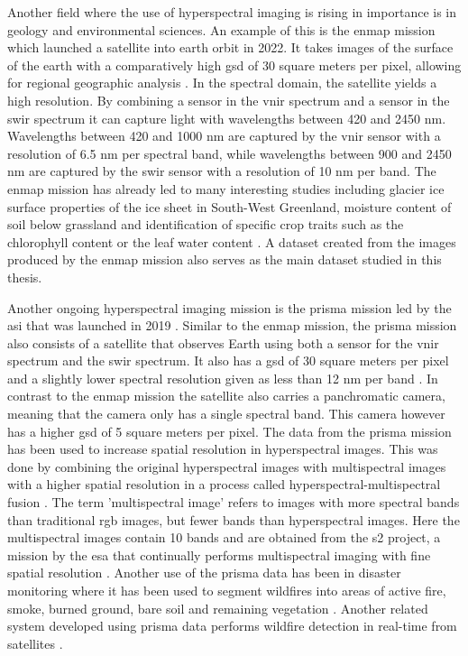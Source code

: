 Another field where the use of hyperspectral imaging is rising in importance is in geology and environmental sciences. An example of this is the \ac{enmap} mission which launched a satellite into earth orbit in 2022. It takes images of the surface of the earth with a comparatively high \ac{gsd} of 30 square meters per pixel, allowing for regional geographic analysis \citep{guanter_enmap_2015}. In the spectral domain, the satellite yields a high resolution. By combining a sensor in the \ac{vnir} spectrum and a sensor in the \ac{swir} spectrum it can capture light with wavelengths between 420 and 2450 nm. Wavelengths between 420 and 1000 nm are captured by the \ac{vnir} sensor with a resolution of 6.5 nm per spectral band, while wavelengths between 900 and 2450 nm are captured by the \ac{swir} sensor with a resolution of 10 nm per band.
The \ac{enmap} mission has already led to many interesting studies including glacier ice surface properties of the ice sheet in South-West Greenland, moisture content of soil below grassland and identification of specific crop traits such as the chlorophyll content or the leaf water content \citep{bohn_glacier_2022,pascual-venteo_prototyping_2022,dopper_estimating_2022}.
A dataset created from the images produced by the \ac{enmap} mission also serves as the main dataset studied in this thesis.

Another ongoing hyperspectral imaging mission is the \ac{prisma} mission led by the \ac{asi} that was launched in 2019 \citep{loizzo_prisma_2019}. Similar to the \ac{enmap} mission, the \ac{prisma} mission also consists of a satellite that observes Earth using both a sensor for the \ac{vnir} spectrum and the \ac{swir} spectrum. It also has a \ac{gsd} of 30 square meters per pixel and a slightly lower spectral resolution given as less than 12 nm per band \citep{guarini_overview_2017,guarini_prisma_2018}. In contrast to the \ac{enmap} mission the satellite also carries a panchromatic camera, meaning that the camera only has a single spectral band. This camera however has a higher \ac{gsd} of 5 square meters per pixel. The data from the \ac{prisma} mission has been used to increase spatial resolution in hyperspectral images. This was done by combining the original hyperspectral images with multispectral images with a higher spatial resolution in a process called hyperspectral-multispectral fusion \citep{acito_prisma_2022}. The term 'multispectral image' refers to images with more spectral bands than traditional \ac{rgb} images, but fewer bands than hyperspectral images. Here the multispectral images contain 10 bands and are obtained from the \ac{s2} project, a mission by the \ac{esa} that continually performs multispectral imaging with fine spatial resolution \citep{drusch_sentinel-2_2012}. Another use of the \ac{prisma} data has been in disaster monitoring where it has been used to segment wildfires into areas of active fire, smoke, burned ground, bare soil and remaining vegetation \citep{spiller_transfer_2022}. Another related system developed using \ac{prisma} data performs wildfire detection in real-time from satellites  \citep{spiller_wildfire_2022}.

